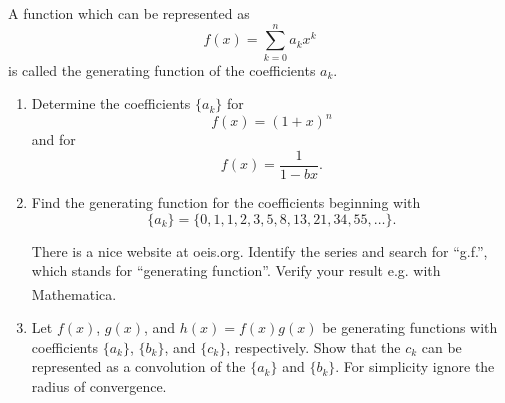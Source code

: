 \begin{Problem}
A function which can be represented as
\[
f(x)=\sum_{k=0}^{n} a_k x^k
\]
is called the generating function of the coefficients \(a_k\).

\begin{enumerate}
\item[(a)] Determine the coefficients \(\{a_k\}\) for
\[
f(x)=(1+x)^n
\]
and for
\[
f(x)=\frac{1}{1-bx}.
\]

\item[(b)] Find the generating function for the coefficients beginning with
\[
\{a_k\}
=
\{0,1,1,2,3,5,8,13,21,34,55,\ldots\}.
\]

There is a nice website at oeis.org. Identify the series and search for
``g.f.'', which stands for ``generating function''.
Verify your result e.g. with Mathematica\textsuperscript{\textregistered}.

\item[(c)] Let \(f(x)\), \(g(x)\), and \(h(x)=f(x)g(x)\) be generating functions
with coefficients \(\{a_k\}\), \(\{b_k\}\), and \(\{c_k\}\), respectively.
Show that the \(c_k\) can be represented as a convolution of the
\(\{a_k\}\) and \(\{b_k\}\). For simplicity ignore the radius of convergence.
\end{enumerate}
\end{Problem}
